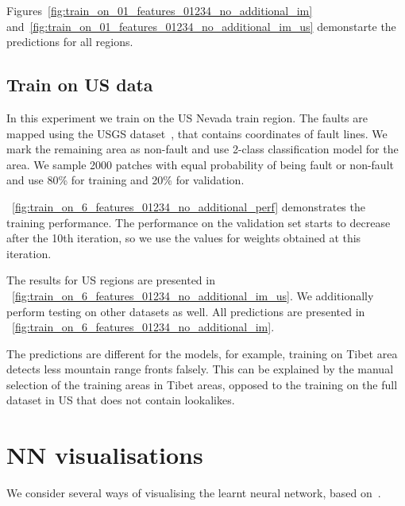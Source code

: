 \documentclass[11pt,a4paper]{article}
\begin{document}
Figures~\ref{fig:train_on_01_features_01234_no_additional_im} and~\ref{fig:train_on_01_features_01234_no_additional_im_us}
demonstarte the predictions for all regions.

\subsection{Train on US data}
In this experiment we train on the US Nevada train region. The faults are mapped using the
USGS dataset~\cite{usgs_data}, that contains coordinates of fault lines. We mark the remaining area as non-fault and use
2-class classification model for the area. We sample 2000 patches with equal probability of being fault or non-fault and
use 80\% for training and 20\% for validation.

\figurename~\ref{fig:train_on_6_features_01234_no_additional_perf} demonstrates the
training performance. The performance on the validation set starts to decrease after the 10th iteration, so we use the
values for weights obtained at this iteration.

The results for US regions are presented in \figurename~\ref{fig:train_on_6_features_01234_no_additional_im_us}. We
additionally perform testing on other datasets as well. All predictions are presented in
\figurename~\ref{fig:train_on_6_features_01234_no_additional_im}.

The predictions are different for the models, for example, training on Tibet area detects less mountain range fronts falsely.
This can be explained by the manual selection of the training areas in Tibet areas, opposed to the training on the full
dataset in US that does not contain lookalikes.

\section{NN visualisations}
We consider several ways of visualising the learnt neural network, based on~\cite[Chapter 5, Section 4]{francois2017deep}.
\end{document}
